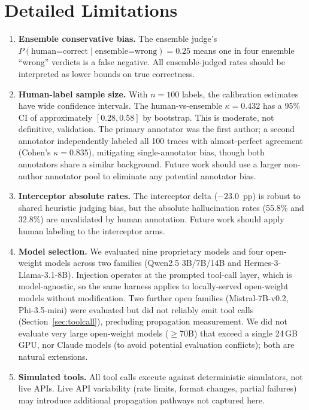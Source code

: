 \documentclass{article}
\begin{document}
\section{Detailed Limitations}
\label{app:limits}
\begin{enumerate}
  \item \textbf{Ensemble conservative bias.}
    The ensemble judge's $P(\text{human=correct} \mid
    \text{ensemble=wrong})=0.25$ means one in four ensemble ``wrong''
    verdicts is a false negative.
    All ensemble-judged rates should be interpreted as lower bounds on
    true correctness.

  \item \textbf{Human-label sample size.}
    With $n{=}100$ labels, the calibration estimates have wide confidence
    intervals.
    The human-vs-ensemble $\kappa{=}0.432$ has a 95\% CI of approximately
    $[0.28, 0.58]$ by bootstrap.
    This is moderate, not definitive, validation.
    The primary annotator was the first author; a second annotator
    independently labeled all 100 traces with almost-perfect agreement
    (Cohen's $\kappa{=}0.835$), mitigating single-annotator bias, though both
    annotators share a similar background.
    Future work should use a larger non-author annotator pool to
    eliminate any potential annotator bias.

  \item \textbf{Interceptor absolute rates.}
    The interceptor delta ($-23.0$~pp) is robust to shared heuristic
    judging bias, but the absolute hallucination rates (55.8\% and
    32.8\%) are unvalidated by human annotation.
    Future work should apply human labeling to the interceptor arms.

  \item \textbf{Model selection.}
    We evaluated nine proprietary models and four open-weight models across two
    families (Qwen2.5 3B/7B/14B and Hermes-3-Llama-3.1-8B). Injection operates
    at the prompted tool-call layer, which is model-agnostic, so the same
    harness applies to locally-served open-weight models without modification.
    Two further open families (Mistral-7B-v0.2, Phi-3.5-mini) were evaluated but
    did not reliably emit tool calls (Section~\ref{sec:toolcall}), precluding
    propagation measurement. We did not
    evaluate very large open-weight models ($\geq$70B) that exceed a single
    24\,GB GPU, nor Claude models (to avoid potential evaluation conflicts);
    both are natural extensions.

  \item \textbf{Simulated tools.}
    All tool calls execute against deterministic simulators, not live
    APIs.
    Live API variability (rate limits, format changes, partial failures)
    may introduce additional propagation pathways not captured here.


\end{enumerate}
\end{document}
